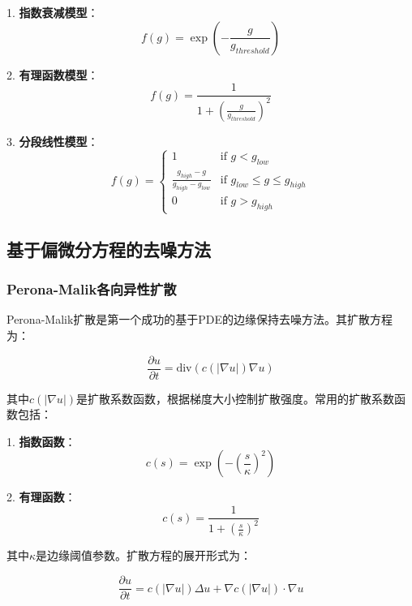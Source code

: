 \documentclass[a4paper,12pt]{ctexart}
\begin{document}
1. \textbf{指数衰减模型}：
\begin{equation}
f(g) = \exp\left(-\frac{g}{g_{threshold}}\right)
\end{equation}

2. \textbf{有理函数模型}：
\begin{equation}
f(g) = \frac{1}{1 + \left(\frac{g}{g_{threshold}}\right)^2}
\end{equation}

3. \textbf{分段线性模型}：
\begin{equation}
f(g) = \begin{cases}
1 & \text{if } g < g_{low} \\
\frac{g_{high} - g}{g_{high} - g_{low}} & \text{if } g_{low} \leq g \leq g_{high} \\
0 & \text{if } g > g_{high}
\end{cases}
\end{equation}

\subsection{基于偏微分方程的去噪方法}

\subsubsection{Perona-Malik各向异性扩散}

Perona-Malik扩散是第一个成功的基于PDE的边缘保持去噪方法。其扩散方程为：

\begin{equation}
\frac{\partial u}{\partial t} = \text{div}(c(|\nabla u|) \nabla u)
\end{equation}

其中$c(|\nabla u|)$是扩散系数函数，根据梯度大小控制扩散强度。常用的扩散系数函数包括：

1. \textbf{指数函数}：
\begin{equation}
c(s) = \exp\left(-\left(\frac{s}{\kappa}\right)^2\right)
\end{equation}

2. \textbf{有理函数}：
\begin{equation}
c(s) = \frac{1}{1 + \left(\frac{s}{\kappa}\right)^2}
\end{equation}

其中$\kappa$是边缘阈值参数。扩散方程的展开形式为：

\begin{equation}
\frac{\partial u}{\partial t} = c(|\nabla u|) \Delta u + \nabla c(|\nabla u|) \cdot \nabla u
\end{equation}
\end{document}
